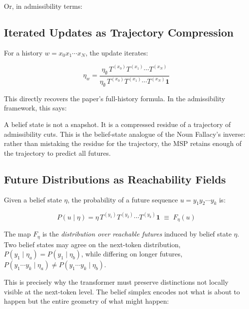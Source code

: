 \documentclass[12pt, a4paper]{article}
\theoremstyle{plain}
\theoremstyle{definition}
\theoremstyle{remark}
\begin{document}
Or, in admissibility terms:
\begin{center}
\end{center}

\subsection{Iterated Updates as Trajectory Compression}

For a history $w = x_0 x_1 \cdots x_N$, the update iterates:

$$\eta_w = \frac{\eta_\emptyset\, T^{(x_0)} T^{(x_1)} \cdots T^{(x_N)}}
{\eta_\emptyset\, T^{(x_0)} T^{(x_1)} \cdots T^{(x_N)} \mathbf{1}}$$

This directly recovers the paper's full-history formula. In the admissibility
framework, this says:

\begin{center}
\end{center}

A belief state is not a snapshot. It is a compressed residue of a trajectory
of admissibility cuts. This is the belief-state analogue of the Noun Fallacy's
inverse: rather than mistaking the residue for the trajectory, the MSP retains
enough of the trajectory to predict all futures.

\subsection{Future Distributions as Reachability Fields}

Given a belief state $\eta$, the probability of a future sequence
$u = y_1 y_2 \cdots y_k$ is:

$$P(u \mid \eta) = \eta\, T^{(y_1)} T^{(y_2)} \cdots T^{(y_k)} \mathbf{1}
\;\equiv\; F_\eta(u)$$

The map $F_\eta$ is the \emph{distribution over reachable futures} induced by
belief state $\eta$. Two belief states may agree on the next-token distribution,
$P(y_1 \mid \eta_a) = P(y_1 \mid \eta_b)$, while differing on longer futures,
$P(y_1 \cdots y_k \mid \eta_a) \neq P(y_1 \cdots y_k \mid \eta_b)$.

This is precisely why the transformer must preserve distinctions not locally
visible at the next-token level. The belief simplex encodes not what is about
to happen but the entire geometry of what might happen:
\end{document}
